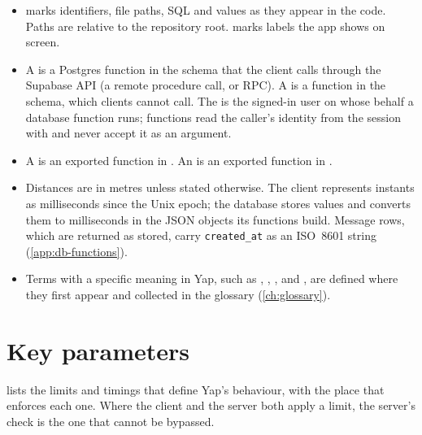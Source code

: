 \begin{itemize}
  \item {} marks identifiers, file paths, SQL and values as they appear in the code.
    Paths are relative to the repository root.  marks labels the app shows on screen.
  \item A  is a Postgres function in the  schema that the client
    calls through the Supabase API (a remote procedure call, or RPC). A  is a function in
    the  schema, which clients cannot call. The  is the signed-in user on whose
    behalf a database function runs; functions read the caller's identity from the session with
     and never accept it as an argument.
  \item A  is an exported function in . An 
    is an exported function in .
  \item Distances are in metres unless stated otherwise. The client represents instants as milliseconds
    since the Unix epoch; the database stores  values and converts them to
    milliseconds in the JSON objects its functions build. Message rows, which are returned as stored,
    carry \texttt{created\_at} as an ISO~8601 string (\cref{app:db-functions}).
  \item Terms with a specific meaning in Yap, such as , , ,
     and , are defined where they first appear and collected in the
    glossary (\cref{ch:glossary}).
\end{itemize}

\section{Key parameters}

 lists the limits and timings that define Yap's behaviour, with the place that
enforces each one. Where the client and the server both apply a limit, the server's check is the one that
cannot be bypassed.

